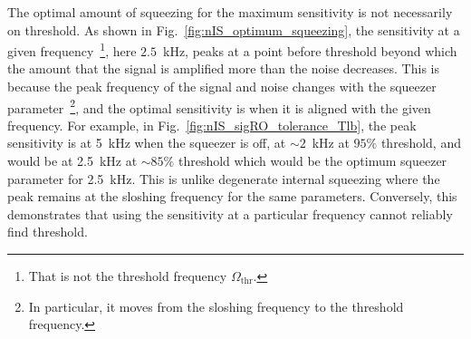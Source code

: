 
The optimal amount of squeezing for the maximum sensitivity is not necessarily on threshold. As shown in Fig.~\ref{fig:nIS_optimum_squeezing}, the sensitivity at a given frequency~\footnote{That is not the threshold frequency $\Omega_\text{thr}$.}, here $2.5$~kHz, peaks at a point before threshold beyond which the amount that the signal is amplified more than the noise decreases.
This is because the peak frequency of the signal and noise changes with the squeezer parameter~\footnote{In particular, it moves from the sloshing frequency to the threshold frequency.}, and the optimal sensitivity is when it is aligned with the given frequency. For example, in Fig.~\ref{fig:nIS_sigRO_tolerance_Tlb}, the peak sensitivity is at 5~kHz when the squeezer is off, at $\sim2$~kHz at $95\%$ threshold, and would be at 2.5~kHz at $\sim85\%$ threshold which would be the optimum squeezer parameter for 2.5~kHz.
This is unlike degenerate internal squeezing where the peak remains at the sloshing frequency for the same parameters. %
Conversely, this demonstrates that using the sensitivity at a particular frequency cannot reliably find threshold. %



